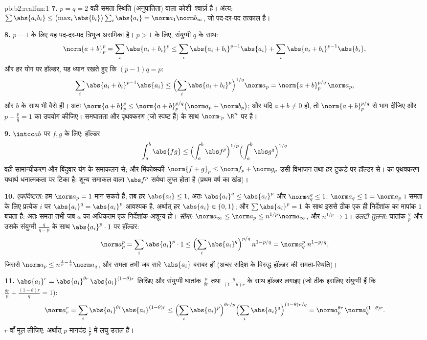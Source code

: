 \begin{solution}{pb:b2:realfun:1}
\textbf{7.} $p = q = 2$ वही समता-स्थिति (अनुपातिता) वाला कोशी--श्वार्ज़ है।
अंत्य: $\sum\abs{a_ib_i}
\leq \bigl(\max_i\abs{b_i}\bigr)\sum_i\abs{a_i} =
\norm a_1\norm b_\infty$, जो पद-दर-पद तत्काल है।

\textbf{8.} $p = 1$ के लिए यह पद-दर-पद त्रिभुज असमिका है। $p > 1$ के लिए,
संयुग्मी $q$ के साथ:
\[
\norm{a+b}_p^p = \sum_i\abs{a_i + b_i}^p
\leq \sum_i\abs{a_i+b_i}^{p-1}\abs{a_i} +
\sum_i\abs{a_i+b_i}^{p-1}\abs{b_i},
\]
और हर योग पर हॉल्डर, यह ध्यान रखते हुए कि $(p - 1)q = p$:
\[
\sum_i\abs{a_i+b_i}^{p-1}\abs{a_i} \leq
\Bigl(\sum_i\abs{a_i+b_i}^{p}\Bigr)^{1/q}\norm a_p
= \norm{a + b}_p^{p/q}\,\norm a_p ,
\]
और $b$ के साथ भी वैसे ही। अतः $\norm{a+b}_p^p \leq \norm{a +
b}_p^{p/q}\bigl(\norm a_p + \norm b_p\bigr)$; और यदि $a + b \neq 0$ हो, तो $\norm{a+b}_p^{p/q}$ से भाग दीजिए
और $p - \frac pq = 1$ का उपयोग कीजिए। समघातता और पृथक्करण (जो स्पष्ट हैं) के साथ $\norm\cdot_p$
$\R^n$ पर  है।

\textbf{9.} $\intcc ab$ पर  $f, g$ के लिए: हॉल्डर
\[
\int_a^b\abs{fg} \leq \Bigl(\int_a^b\abs
f^p\Bigr)^{1/p}\Bigl(\int_a^b\abs g^q\Bigr)^{1/q}
\]
वही सामान्यीकरण और बिंदुवार यंग के समाकलन से; और मिंकोव्स्की $\norm{f + g}_p \leq \norm f_p + \norm g_p$ उसी
विभाजन तथा हर टुकड़े पर हॉल्डर से।  का पृथक्करण यथार्थ धनात्मकता
पर टिका है: शून्य समाकल वाला  $\abs f^p$ सर्वथा लुप्त होता है (प्रथम वर्ष
का खंड)।

\textbf{10.} \emph{एकदिष्टता:} हम $\norm a_p = 1$ मान सकते हैं; तब हर $\abs{a_i} \leq 1$, अतः $\abs{a_i}^q \leq \abs{a_i}^p$
और $\norm a_q^q \leq 1$: $\norm a_q \leq 1 = \norm a_p$। समता के लिए प्रत्येक $i$ पर $\abs{a_i}^q = \abs{a_i}^p$ आवश्यक है, अर्थात् हर $\abs{a_i} \in \{0, 1\}$;
और $\sum\abs{a_i}^p = 1$ के साथ इससे ठीक एक ही निर्देशांक का मापांक $1$ बचता है: अतः समता
तभी जब $a$ का अधिकतम एक निर्देशांक अशून्य हो। \emph{सीमा:} $\norm a_\infty \leq
\norm a_p \leq n^{1/p}\norm a_\infty$, और
$n^{1/p} \to 1$। \emph{उलटी तुलना:} घातांक $\frac
qp$ और उसके संयुग्मी $\frac{q}{q-p}$ के साथ $\abs{a_i}^p\cdot 1$
पर हॉल्डर:
\[
\norm a_p^p = \sum_i\abs{a_i}^p\cdot 1 \leq
\Bigl(\sum_i\abs{a_i}^{q}\Bigr)^{p/q}\,n^{1 - p/q}
= \norm a_q^{p}\; n^{1-p/q},
\]
जिससे $\norm a_p \leq n^{\frac1p - \frac1q}\norm a_q$, और समता तभी जब सारे $\abs{a_i}$ बराबर हों (अचर सदिश के विरुद्ध
हॉल्डर की समता-स्थिति)।

\textbf{11.} $\abs{a_i}^r = \abs{a_i}^{\theta
r}\,\abs{a_i}^{(1-\theta)r}$ लिखिए और संयुग्मी घातांक $\frac{p}{\theta r}$ तथा $\frac{q}{(1-\theta)r}$ के साथ हॉल्डर
लगाइए (जो ठीक इसलिए संयुग्मी हैं कि $\frac{\theta
r}p + \frac{(1-\theta)r}q = 1$):
\[
\norm a_r^r = \sum_i \abs{a_i}^{\theta r}\abs{a_i}^{(1-\theta)r}
\leq \Bigl(\sum_i\abs{a_i}^{p}\Bigr)^{\theta r/p}
\Bigl(\sum_i\abs{a_i}^{q}\Bigr)^{(1-\theta)r/q}
= \norm a_p^{\theta r}\,\norm a_q^{(1-\theta)r} .
\]
$r$-वाँ मूल लीजिए: अर्थात् $p$-मानदंड $\frac1p$ में लघु-उत्तल हैं।


\end{solution}
